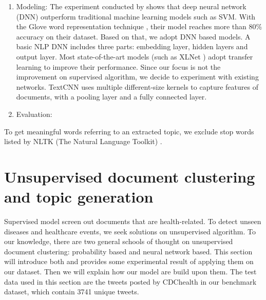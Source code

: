 \begin{enumerate}
    \item Modeling: The experiment conducted by \cite{serban2019real} shows that deep neural network (DNN) outperform traditional machine learning models such as SVM. With the Glove word representation technique \cite{pennington2014glove}, their model reaches more than 80\% accuracy on their dataset. Based on that, we adopt DNN based models. A basic NLP DNN includes three parts: embedding layer, hidden layers and output layer. Most state-of-the-art models (such as XLNet \cite{yang2019xlnet}) adopt transfer learning to improve their performance. Since our focus is not the improvement on supervised algorithm, we decide to experiment with existing networks. TextCNN \cite{kim2014convolutional} uses multiple different-size kernels to capture features of documents, with a pooling layer and a fully connected layer. 
    \item Evaluation:
\end{enumerate}

To get meaningful words referring to an extracted topic, we exclude stop words listed by NLTK (The Natural Language Toolkit) \cite{journals/corr/cs-CL-0205028}.

\section{Unsupervised document clustering and topic generation}
\label{sec:unsupervised}
Supervised model screen out documents that are health-related. To detect unseen diseases and healthcare events, we seek solutions on unsupervised algorithm. To our knowledge, there are two general schools of thought on unsupervised document clustering: probability based and neural network based. This section will introduce both and provides some experimental result of applying them on our dataset. Then we will explain how our model are build upon them. The test data used in this section are the tweets posted by CDChealth in our benchmark dataset, which contain 3741 unique tweets.

